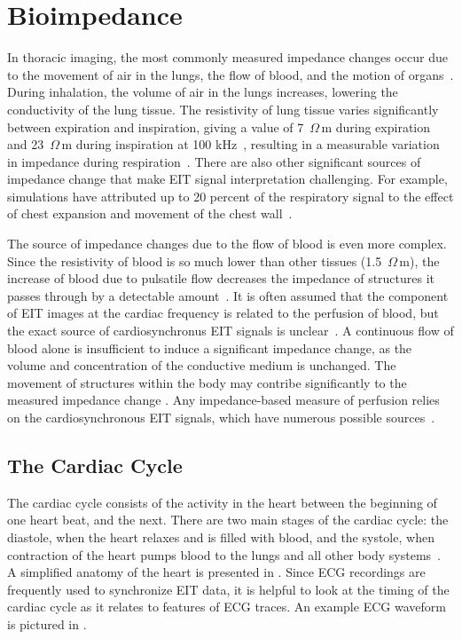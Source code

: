 \section{Bioimpedance}
\label{sec:bioimpedance}
In thoracic imaging, the most commonly measured 
impedance changes occur due to the movement 
of air in the lungs, the flow of blood, and the motion of 
organs~\parencite{adler_electrical_2017}. 
During inhalation, the volume of air in the lungs increases, lowering the 
conductivity of the lung tissue. 
The resistivity of lung tissue varies significantly
between expiration and inspiration, giving a value of 7~$\Omega$\,m during expiration
and 23~$\Omega$\,m during inspiration at 100 kHz~\parencite{witsoe_electrical_1967},
resulting in a
measurable variation in impedance during respiration~\parencite{eyuboglu_vivo_1989}. 
There are also other 
significant sources of impedance change that make EIT signal interpretation 
challenging. For example, simulations have attributed up to 20
percent of the respiratory signal to the effect of 
chest expansion and movement of the chest 
wall~\parencite{adler_impedance_1994}.

The source of impedance changes due to the flow of blood is even more complex. 
Since the resistivity of blood is so much lower than other tissues 
(1.5~$\Omega$\,m), the increase of blood due to pulsatile 
flow decreases the impedance of structures it passes through 
by a detectable amount~\parencite{eyuboglu_vivo_1989}.
It is often assumed that the component of EIT images at the cardiac 
frequency is related to the perfusion of blood, but the exact source of
cardiosynchronus EIT signals is 
unclear~\parencite{patterson_impedance_2010,nguyen_review_2012}.
A continuous flow of blood alone is insufficient 
to induce a significant impedance change, 
as the volume and concentration of the conductive medium is unchanged. 
The movement of structures within the body may contribe 
significantly to the measured impedance 
change \parencite{braun_limitations_2018}.
Any impedance-based measure of perfusion relies on the cardiosynchronous 
EIT signals, which have numerous possible sources~\parencite{adler_origins_2017}. 

\subsection{The Cardiac Cycle}
The cardiac cycle consists of the activity in the heart between the
beginning of one heart beat, and the next. There are two main stages 
of the cardiac cycle: the diastole, when the heart relaxes and is filled 
with blood, and the systole, when contraction of the heart pumps blood to
the lungs and all other body systems~\parencite{pappano_cardiovascular_2019}. 
A simplified anatomy of the heart is 
presented in . 
Since ECG recordings are frequently used to synchronize 
EIT data, it is helpful to look at the timing of the cardiac cycle as it 
relates to features of ECG traces. An example ECG waveform is pictured in 
. 

